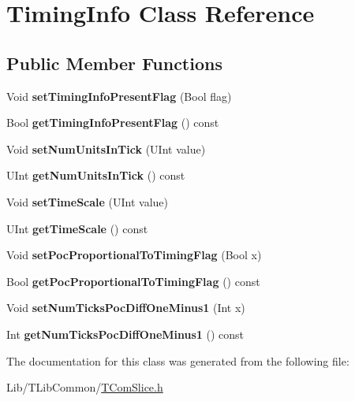 \hypertarget{class_timing_info}{}\section{Timing\+Info Class Reference}
\label{class_timing_info}
\subsection*{Public Member Functions}
\begin{DoxyCompactItemize}
\item 
\mbox{\label{class_timing_info_a88ef72f3c530da753d479abd42b8e2d2}} 
Void {\bfseries set\+Timing\+Info\+Present\+Flag} (Bool flag)
\item 
\mbox{\label{class_timing_info_a5f1bc6ef9467ef6f276ef58f84fa98e7}} 
Bool {\bfseries get\+Timing\+Info\+Present\+Flag} () const
\item 
\mbox{\label{class_timing_info_a57da21af84c2bc9e10ede24c67f952b1}} 
Void {\bfseries set\+Num\+Units\+In\+Tick} (U\+Int value)
\item 
\mbox{\label{class_timing_info_a98f8dae7b23713f294afeaa4f95dbc13}} 
U\+Int {\bfseries get\+Num\+Units\+In\+Tick} () const
\item 
\mbox{\label{class_timing_info_aff5feb831a750674c34bf372aebae04e}} 
Void {\bfseries set\+Time\+Scale} (U\+Int value)
\item 
\mbox{\label{class_timing_info_aa5c59d9d089270913838a6c25e1f81e7}} 
U\+Int {\bfseries get\+Time\+Scale} () const
\item 
\mbox{\label{class_timing_info_a35088f0bf04b5a7ed5e9d08aa4a382a6}} 
Void {\bfseries set\+Poc\+Proportional\+To\+Timing\+Flag} (Bool x)
\item 
\mbox{\label{class_timing_info_ab39d48d3087a622675556fbad7017d98}} 
Bool {\bfseries get\+Poc\+Proportional\+To\+Timing\+Flag} () const
\item 
\mbox{\label{class_timing_info_a3ddd1f34a045d8a3ef66457dc81d19f9}} 
Void {\bfseries set\+Num\+Ticks\+Poc\+Diff\+One\+Minus1} (Int x)
\item 
\mbox{\label{class_timing_info_a2b719c08aec536e3006ab0250f9951a6}} 
Int {\bfseries get\+Num\+Ticks\+Poc\+Diff\+One\+Minus1} () const
\end{DoxyCompactItemize}


The documentation for this class was generated from the following file\+:\begin{DoxyCompactItemize}
\item 
Lib/\+T\+Lib\+Common/\hyperlink{_t_com_slice_8h}{T\+Com\+Slice.\+h}\end{DoxyCompactItemize}
